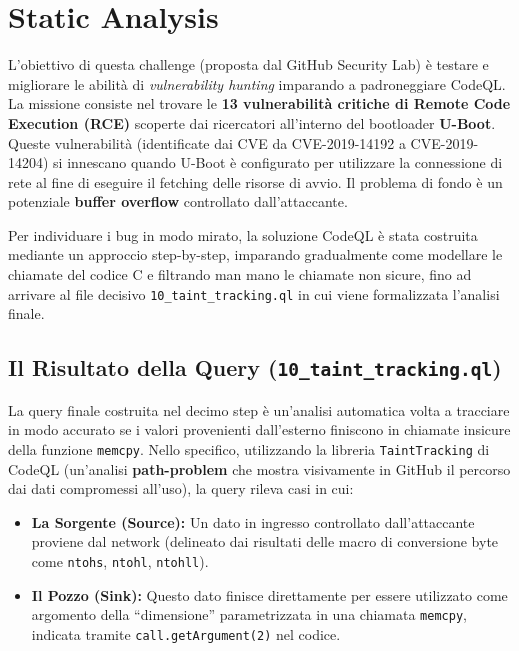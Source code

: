 \chapter{Static Analysis}

L'obiettivo di questa challenge (proposta dal GitHub Security Lab) è testare e migliorare le abilità di \textit{vulnerability hunting} imparando a padroneggiare CodeQL. La missione consiste nel trovare le \textbf{13 vulnerabilità critiche di Remote Code Execution (RCE)} scoperte dai ricercatori all'interno del bootloader \textbf{U-Boot}. Queste vulnerabilità (identificate dai CVE da CVE-2019-14192 a CVE-2019-14204) si innescano quando U-Boot è configurato per utilizzare la connessione di rete al fine di eseguire il fetching delle risorse di avvio. Il problema di fondo è un potenziale \textbf{buffer overflow} controllato dall'attaccante.

Per individuare i bug in modo mirato, la soluzione CodeQL è stata costruita mediante un approccio step-by-step, imparando gradualmente come modellare le chiamate del codice C e filtrando man mano le chiamate non sicure, fino ad arrivare al file decisivo \texttt{10\_taint\_tracking.ql} in cui viene formalizzata l'analisi finale.

\section{Il Risultato della Query (\texttt{10\_taint\_tracking.ql})}

La query finale costruita nel decimo step è un'analisi automatica volta a tracciare in modo accurato se i valori provenienti dall'esterno finiscono in chiamate insicure della funzione \texttt{memcpy}. 
Nello specifico, utilizzando la libreria \texttt{TaintTracking} di CodeQL (un'analisi \textbf{path-problem} che mostra visivamente in GitHub il percorso dai dati compromessi all'uso), la query rileva casi in cui:
\begin{itemize}
  \item \textbf{La Sorgente (Source):} Un dato in ingresso controllato dall'attaccante proviene dal network (delineato dai risultati delle macro di conversione byte come \texttt{ntohs}, \texttt{ntohl}, \texttt{ntohll}).
  \item \textbf{Il Pozzo (Sink):} Questo dato finisce direttamente per essere utilizzato come argomento della ``dimensione'' parametrizzata in una chiamata \texttt{memcpy}, indicata tramite \texttt{call.getArgument(2)} nel codice.
\end{itemize}

